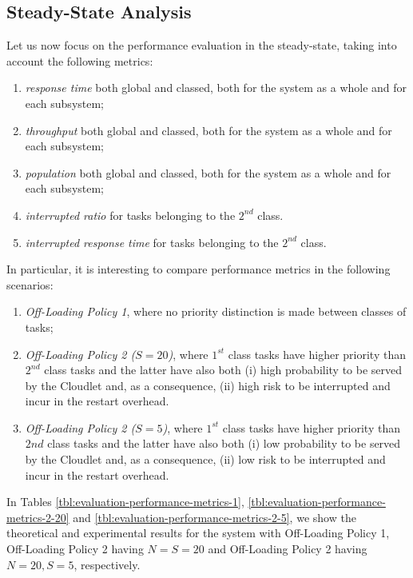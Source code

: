 \subsection{Steady-State Analysis}
Let us now focus on the performance evaluation in the steady-state, taking into account the following metrics:

\begin{enumerate}
	\item \textit{response time} both global and classed, both for the system as a whole and for each subsystem;
	
	\item \textit{throughput} both global and classed, both for the system as a whole and for each subsystem;
	
	\item \textit{population} both global and classed, both for the system as a whole and for each subsystem;
	
	\item \textit{interrupted ratio} for tasks belonging to the $2^{nd}$ class.	
	
	\item \textit{interrupted response time} for tasks belonging to the $2^{nd}$ class.
\end{enumerate}

In particular, it is interesting to compare performance metrics in the following scenarios:

\begin{enumerate}
	\item \textit{Off-Loading Policy 1}, where no priority distinction is made between classes of tasks;
	
	\item \textit{Off-Loading Policy 2 ($S=20$)}, where $1^{st}$ class tasks have higher priority than $2^{nd}$ class tasks and the latter have also both (i) high probability to be served by the Cloudlet and, as a consequence, (ii) high risk to be interrupted and incur in the restart overhead.
	
	\item \textit{Off-Loading Policy 2 ($S=5$)}, where $1^{st}$ class tasks have  higher priority than $2{nd}$ class tasks and the latter have also both (i) low probability to be served by the Cloudlet and, as a consequence, (ii) low risk to be interrupted and incur in the restart overhead.
\end{enumerate}

In Tables \ref{tbl:evaluation-performance-metrics-1}, \ref{tbl:evaluation-performance-metrics-2-20} and \ref{tbl:evaluation-performance-metrics-2-5}, we show the theoretical and experimental results for the system with Off-Loading Policy 1,  Off-Loading Policy 2 having $N=S=20$ and Off-Loading Policy 2 having $N=20,S=5$, respectively.

